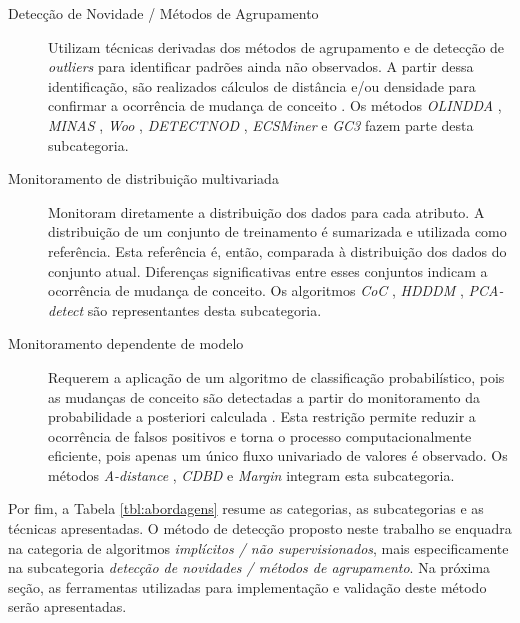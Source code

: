 \documentclass[msc, classic, a4paper]{ufbathesis}
\begin{document}
\begin{description}
    \item[Detecção de Novidade / Métodos de Agrupamento]
    Utilizam técnicas derivadas dos métodos de agrupamento e de detecção de \textit{outliers} para identificar padrões ainda não observados.
    A partir dessa identificação, são realizados cálculos de distância e/ou densidade para confirmar a ocorrência de mudança de conceito \cite{Ryu:Kantardzic:2012}.
    Os métodos
    \textit{OLINDDA} \cite{Spinosa:2007:OCA:1244002.1244107},
    \textit{MINAS} \cite{Faria:2013:NDA:2480362.2480515},
    \textit{Woo} \cite{Ryu:Kantardzic:2012},
    \textit{DETECTNOD} \cite{Hashemi:Hayat:DETECTNOD:2010},
    \textit{ECSMiner} \cite{Masud:2011:CNC:1978259.1978529} e
    \textit{GC3} \cite{Sethi2016b:GC3} fazem parte desta subcategoria.

    \item[Monitoramento de distribuição multivariada]
    Monitoram diretamente a distribuição dos dados para cada atributo.
    A distribuição de um conjunto de treinamento é sumarizada e utilizada como referência.
    Esta referência é, então, comparada à distribuição dos dados do conjunto atual.
    Diferenças significativas entre esses conjuntos indicam a ocorrência de mudança de conceito.
    Os algoritmos
    \textit{CoC} \cite{Lee:Magoules:CoC:2012},
    \textit{HDDDM} \cite{Ditzler:Polikar:HDDDM:2011},
    \textit{PCA-detect} \cite{Kuncheva:PCADetect:20085}
    são representantes desta subcategoria.

    \item[Monitoramento dependente de modelo]
    Requerem a aplicação de um algoritmo de classificação probabilístico,
    pois as mudanças de conceito são detectadas a partir do monitoramento da probabilidade a posteriori calculada \cite{Zliobaite:2010}.
    Esta restrição permite reduzir a ocorrência de falsos positivos e torna o processo computacionalmente eficiente, pois apenas um único fluxo univariado de valores é observado.
    Os métodos
    \textit{A-distance} \cite{Dredze:ADistance:2010585},
    \textit{CDBD} \cite{Lindstrom:CDBD:2013} e
    \textit{Margin} \cite{Dries:Margin:2009} integram esta subcategoria.
\end{description}

Por fim, a Tabela \ref{tbl:abordagens} resume as categorias, as subcategorias e as técnicas apresentadas.
O método de detecção proposto neste trabalho se enquadra na categoria de algoritmos \textit{implícitos / não supervisionados}, mais especificamente na subcategoria \textit{detecção de novidades / métodos de agrupamento}.
Na próxima seção, as ferramentas utilizadas para implementação e validação deste método serão apresentadas.
\end{document}

